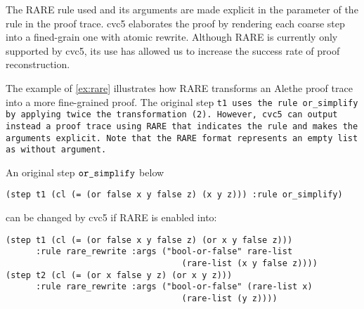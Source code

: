 The RARE rule used and its arguments are made explicit in the  parameter of the rule  in the proof trace.
cvc5 elaborates the proof by rendering each coarse step into a fined-grain one with atomic rewrite.
Although RARE is currently only supported by cvc5, its use has allowed us to increase the success rate of proof reconstruction.

The example of \cref{ex:rare} illustrates how RARE transforms an Alethe proof trace into a more fine-grained proof.
The original step \tt{t1} uses the rule \tt{or\_simplify} by applying twice the transformation (2).
However, cvc5 can output instead a proof trace using RARE that indicates the rule  and makes the arguments explicit.
Note that the RARE format represents an empty list as  without argument.

\begin{example}\label{ex:rare}
An original step $\texttt{\upshape{or\_simplify}}$ below
\begin{lstlisting}[language=SMT,numbers=none]
(step t1 (cl (= (or false x y false z) (x y z))) :rule or_simplify)
\end{lstlisting}
%
can be changed by cvc5 if RARE is enabled into:
%
\begin{lstlisting}[language=SMT]
(step t1 (cl (= (or false x y false z) (or x y false z)))
      :rule rare_rewrite :args ("bool-or-false" rare-list
                                   (rare-list (x y false z))))
(step t2 (cl (= (or x false y z) (or x y z)))
      :rule rare_rewrite :args ("bool-or-false" (rare-list x)
                                   (rare-list (y z))))
\end{lstlisting}
\end{example}